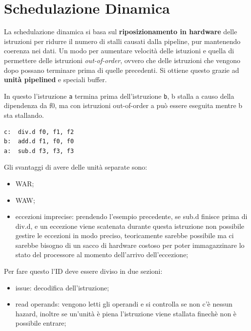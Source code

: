 \documentclass[12pt]{article}
\begin{document}
\newpage
\section{Schedulazione Dinamica}
La schedulazione dinamica si basa sul \textbf{riposizionamento in hardware} delle istruzioni per ridurre il numero di stalli causati dalla pipeline, pur mantenendo coerenza nei dati. Un modo per aumentare velocit\`a delle istuzioni e quella di permettere delle istruzioni \textit{out-of-order}, ovvero che delle istruzioni che vengono dopo possano terminare prima di quelle precedenti. Si ottiene questo grazie ad \textbf{unit\`a pipelined} e speciali buffer.
\begin{example}{}{}
    In questo l'istruzione \texttt{a} termina prima dell'istruzione \texttt{b}, b stalla a causo della dipendenza da f0, ma con istruzioni out-of-order a pu\`o essere eseguita mentre b sta stallando.
\begin{lstlisting}
c:  div.d f0, f1, f2
b:  add.d f1, f0, f0
a:  sub.d f3, f3, f3
\end{lstlisting}
\end{example}
Gli svantaggi di avere delle unit\`a separate sono:
\begin{itemize}
    \item WAR;
    \item WAW;
    \item eccezioni imprecise: prendendo l'esempio precedente, se sub.d finisce prima di div.d, e un eccezione  viene scatenata durante questa istruzione non possibile gestire le eccezioni in modo preciso, teoricamente sarebbe possibile ma ci sarebbe bisogno di un sacco di hardware costoso per poter immagazzinare lo stato del processore al momento dell'arrivo dell'eccezione;
\end{itemize}
Per fare questo l'ID deve essere diviso in due sezioni:
\begin{itemize}
    \item issue: decodifica dell'istruzione;
    \item read operands: vengono letti gli operandi e si controlla se non c'\`e nessun hazard, inoltre se un'unit\`a \`e piena l'istruzione viene stallata finech\`e non \`e possibile entrare;
\end{itemize}
\end{document}

